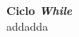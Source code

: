 \documentclass[preview]{standalone}
\begin{document}
\begin{center}
\textbf{Ciclo \textit{While}} \\addadda
\end{center}
\end{document}
